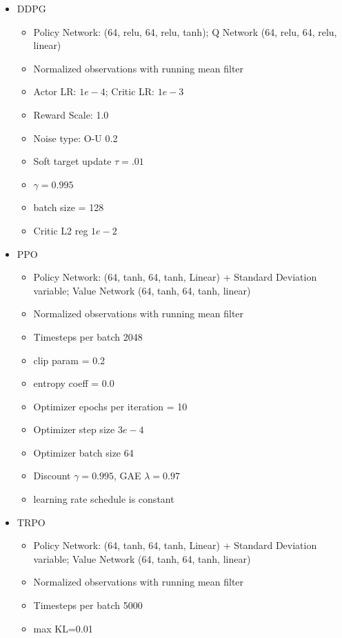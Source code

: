 \begin{itemize}
    \item DDPG
    \begin{itemize}
        \item Policy Network: (64, relu, 64, relu, tanh); Q Network (64, relu, 64, relu, linear)
        \item Normalized observations with running mean filter
        \item Actor LR: $1e-4$; Critic LR: $1e-3$
        \item Reward Scale: 1.0
        \item Noise type: O-U 0.2
        \item Soft target update $\tau=.01$
        \item $\gamma=0.995$
        \item batch size = 128
        \item Critic L2 reg $1e-2$
    \end{itemize}
    \item PPO
    \begin{itemize}
        \item Policy Network: (64, tanh, 64, tanh, Linear) + Standard Deviation variable; Value Network (64, tanh, 64, tanh, linear)
        \item Normalized observations with running mean filter
        \item Timesteps per batch 2048
        \item clip param = 0.2
        \item entropy coeff = 0.0
        \item Optimizer epochs per iteration = 10
        \item Optimizer step size $3e-4$
        \item Optimizer batch size 64
        \item Discount $\gamma=0.995$, GAE $\lambda=0.97$
        \item learning rate schedule is constant
    \end{itemize}
    \item TRPO
    \begin{itemize}
        \item Policy Network: (64, tanh, 64, tanh, Linear) + Standard Deviation variable; Value Network (64, tanh, 64, tanh, linear)
        \item Normalized observations with running mean filter
        \item Timesteps per batch 5000
        \item max KL=0.01

\end{itemize}
\end{itemize}
